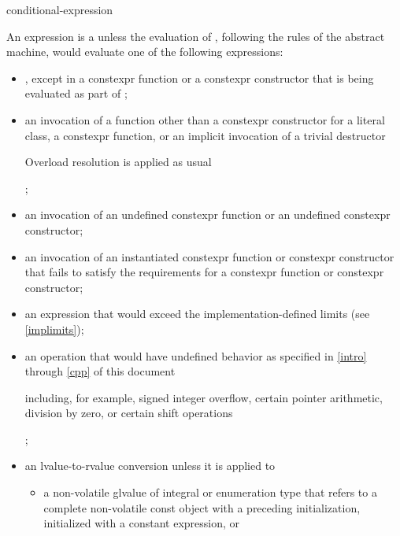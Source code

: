 \begin{bnf}
\br
    conditional-expression
\end{bnf}

\pnum
An expression  is a
unless the evaluation of , following the rules of the abstract
machine, would evaluate one of the following expressions:

\begin{itemize}
\item
{}, except in a constexpr
function or a constexpr constructor that is being evaluated as part
of ;

\item
an invocation of a function other than
a constexpr constructor for a literal class,
a constexpr function,
or an implicit invocation of a trivial destructor
\begin{note} Overload resolution
is applied as usual \end{note};

\item
an invocation of an undefined constexpr function or an
undefined constexpr constructor;

\item
an invocation of an instantiated constexpr function or
constexpr constructor that fails to satisfy the requirements
for a constexpr function or
constexpr constructor;

\item
an expression that would exceed the implementation-defined
limits (see \ref{implimits});

\item
an operation that would have undefined behavior
as specified in \ref{intro} through \ref{cpp}
of this document \begin{note} including,
for example, signed integer overflow, certain
pointer arithmetic, division by
zero, or certain shift operations
\end{note};

\item
an lvalue-to-rvalue conversion unless
it is applied to

\begin{itemize}
  \item
  a non-volatile glvalue of integral or enumeration type that refers
  to a complete non-volatile const object with a preceding initialization,
  initialized with a constant expression, or


\end{itemize}
\end{itemize}
